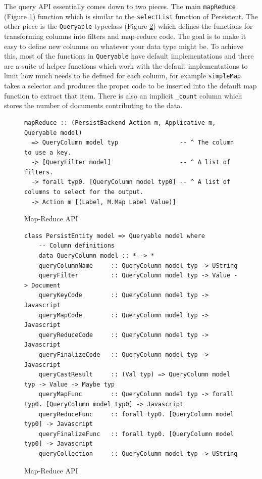 \documentclass[letterpaper,twocolumn,9pt]{article}
\newcommand{\code}[1]{\texttt{#1}}
\begin{document}
The query API essentially comes down to two pieces.  The main \code{mapReduce} (Figure \ref{mrapi}) function which is similar to the \code{selectList} function of Persistent.  The other piece is the \code{Queryable} typeclass (Figure \ref{queryable}) which defines the functions for transforming columns into filters and map-reduce code.  The goal is to make it easy to define new columns on whatever your data type might be.  To achieve this, most of the functions in \code{Queryable} have default implementations and there are a suite of helper functions which work with the default implementations to limit how much needs to be defined for each column, for example \code{simpleMap} takes a selector and produces the proper code to be inserted into the default map function to extract that item.  There is also an implicit \code{\_count} column which stores the number of documents contributing to the data.

\begin{figure}[t]
\footnotesize{
\begin{verbatim}
mapReduce :: (PersistBackend Action m, Applicative m, Queryable model)
  => QueryColumn model typ                 -- ^ The column to use a key.
  -> [QueryFilter model]                   -- ^ A list of filters.
  -> forall typ0. [QueryColumn model typ0] -- ^ A list of columns to select for the output.
  -> Action m [(Label, M.Map Label Value)]
\end{verbatim}
}
    \caption{Map-Reduce API}
    \label{mrapi}
\end{figure}

\begin{figure}[t]
\footnotesize{
\begin{verbatim}
class PersistEntity model => Queryable model where
    -- Column definitions
    data QueryColumn model :: * -> *
    queryColumnName     :: QueryColumn model typ -> UString
    queryFilter         :: QueryColumn model typ -> Value -> Document
    queryKeyCode        :: QueryColumn model typ -> Javascript
    queryMapCode        :: QueryColumn model typ -> Javascript
    queryReduceCode     :: QueryColumn model typ -> Javascript
    queryFinalizeCode   :: QueryColumn model typ -> Javascript
    queryCastResult     :: (Val typ) => QueryColumn model typ -> Value -> Maybe typ
    queryMapFunc        :: QueryColumn model typ -> forall typ0. [QueryColumn model typ0] -> Javascript
    queryReduceFunc     :: forall typ0. [QueryColumn model typ0] -> Javascript
    queryFinalizeFunc   :: forall typ0. [QueryColumn model typ0] -> Javascript
    queryCollection     :: QueryColumn model typ -> UString
\end{verbatim}
}
    \caption{Map-Reduce API}
    \label{queryable}
\end{figure}
\end{document}

